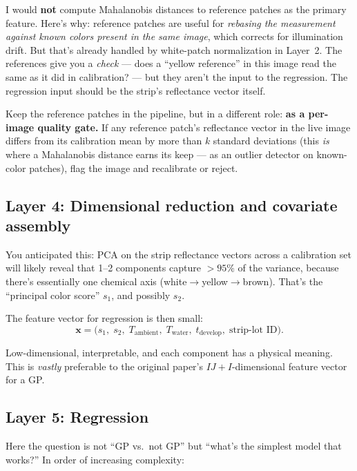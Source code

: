 \documentclass[11pt,letterpaper]{article}
\begin{document}
I would \textbf{not} compute Mahalanobis distances to reference patches as
the primary feature. Here's why: reference patches are useful for
\emph{rebasing the measurement against known colors present in the same
image}, which corrects for illumination drift. But that's already handled
by white-patch normalization in Layer~2. The references give you a
\emph{check} --- does a ``yellow reference'' in this image read the same as
it did in calibration? --- but they aren't the input to the regression. The
regression input should be the strip's reflectance vector itself.

Keep the reference patches in the pipeline, but in a different role:
\textbf{as a per-image quality gate.} If any reference patch's reflectance
vector in the live image differs from its calibration mean by more than $k$
standard deviations (this \emph{is} where a Mahalanobis distance earns its
keep --- as an outlier detector on known-color patches), flag the image and
recalibrate or reject.

\subsection*{Layer 4: Dimensional reduction and covariate assembly}

You anticipated this: PCA on the strip reflectance vectors across a
calibration set will likely reveal that 1--2 components capture $>95\%$ of
the variance, because there's essentially one chemical axis
(white$\to$yellow$\to$brown). That's the ``principal color score'' $s_1$,
and possibly $s_2$.

The feature vector for regression is then small:
\begin{equation*}
  \mathbf{x} = \bigl(s_1,\; s_2,\; T_{\text{ambient}},\; T_{\text{water}},\;
    t_{\text{develop}},\; \text{strip-lot ID}\bigr).
\end{equation*}

Low-dimensional, interpretable, and each component has a physical meaning.
This is \emph{vastly} preferable to the original paper's $IJ+I$-dimensional
feature vector for a GP.

\subsection*{Layer 5: Regression}

Here the question is not ``GP vs.\ not GP'' but ``what's the simplest
model that works?'' In order of increasing complexity:
\end{document}
